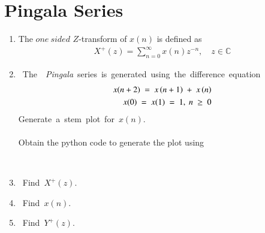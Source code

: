 \documentclass[journal,12pt,twocolumn]{IEEEtran}
\renewcommand\thesection{\arabic{section}}
\begin{document}
\section{Pingala Series}
\begin{enumerate}[label=\thesection.\arabic*,ref=\thesection.\theenumi]
	
	\item The $one\ sided$ $Z$-transform of $x(n)$ is defined as
		\begin{align}
			X^+(z) = \sum_{n=0}^\infty x(n)z^{-n}, \quad z \in \mathbb{C}
			\label{eq:one-Z}
		\end{align}

	\item The {\em Pingala} series is generated using the difference equation  
		\begin{align} 
			x(n+2) = x\brak{n+1} + x\brak{n}\\ 
			x(0) = x(1) = 1, n \ge 0 
			\label{eq:10-pingala} 
		\end{align} 
		Generate a stem plot for $x(n)$.\\

	\solution\\
		Obtain the python code to generate the plot using 
		\begin{lstlisting}
			
		\end{lstlisting}
		

	\item Find $X^{+}(z)$.\\

	\item Find $x(n)$.\\

	\item Find $Y^{+}(z)$.
	
	
\end{enumerate}
\end{document}

